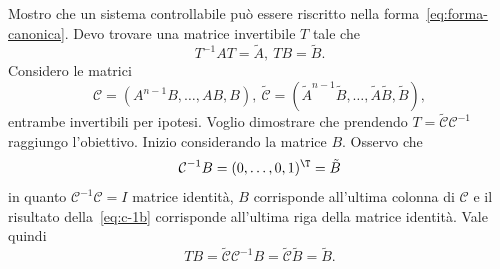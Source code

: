 \begin{steps}
    \item Mostro che un sistema controllabile può essere riscritto nella forma~\eqref{eq:forma-canonica}.
     Devo trovare una matrice invertibile $T$ tale che
    \begin{equation*}
        T^{-1} A T = \tilde A, \ TB = \tilde B.
    \end{equation*}
    Considero le matrici
    \begin{equation*}
        \mathcal C = (A^{n-1} B, \ldots, AB, B),\
        \tilde {\mathcal C} = (\tilde A^{n-1} \tilde B, \ldots, \tilde A \tilde B, \tilde B),
    \end{equation*}
    entrambe invertibili per ipotesi.
    Voglio dimostrare che prendendo $T = \tilde {\mathcal C} {\mathcal C}^{-1}$ raggiungo l'obiettivo.
    Inizio considerando la matrice $B$. Osservo che
    \begin{equation}
        \mathcal C^{-1}B = (0, \ldots, 0, 1)^{\T} = \tilde B
        \label{eq:c-1b}
    \end{equation}
    in quanto $\mathcal C^{-1} \mathcal C = I$ matrice identità,
    $B$ corrisponde all'ultima colonna di $\mathcal C$ e
    il risultato della~\eqref{eq:c-1b} corrisponde all'ultima riga della matrice identità.
    Vale quindi
    \begin{equation*}
        T B = \tilde {\mathcal C} \mathcal C^{-1} B = \tilde {\mathcal C} \tilde B = \tilde B.
    \end{equation*}


\end{steps}
